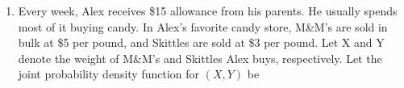 \documentclass[12pt]{article} %
\newcommand{\Red}{\color{Red}}
\begin{document}
\begin{enumerate}
        
        

\newpage
\item Every week, Alex receives \$15 allowance from his parents. He usually spends most of it buying candy. In Alex’s favorite candy store, M\&M’s are sold in bulk at \$5 per pound, and Skittles are sold at \$3 per pound. Let X and Y denote the weight of M\&M’s and Skittles Alex buys, respectively. Let the joint probability
density function for $( X , Y )$ be


\end{enumerate}
\end{document}
